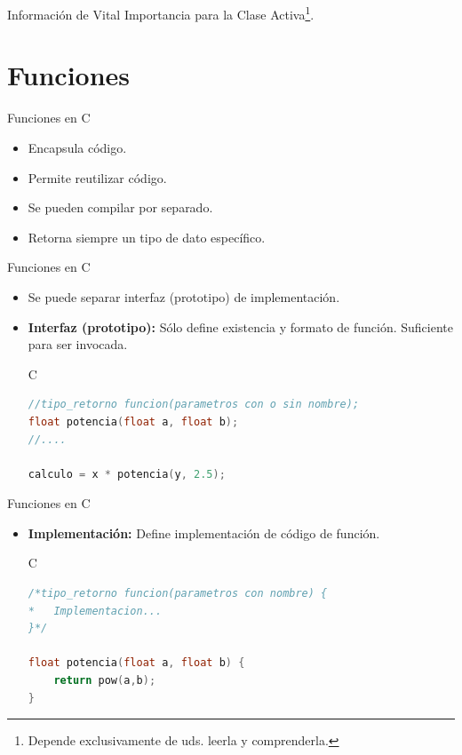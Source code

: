 \documentclass{beamer}
\begin{document}
\begin{frame}
\centering \Huge Información de Vital Importancia para la Clase Activa\footnote{Depende exclusivamente de uds. leerla y comprenderla.}.
\end{frame}
\section{Funciones}
\begin{frame}[fragile]{Funciones en C}
\begin{itemize}
	\item Encapsula código.
	\item Permite reutilizar código.
	\item Se pueden compilar por separado.
	\item Retorna siempre un tipo de dato específico. 
\end{itemize}
\end{frame}

\begin{frame}[fragile]{Funciones en C}
\begin{itemize}
	\item Se puede separar interfaz (prototipo) de implementación.
	\item \textbf{Interfaz (prototipo):} Sólo define existencia y formato de función. Suficiente para ser invocada.
	\begin{exampleblock}{C}
	\begin{lstlisting}[language=C, basicstyle=\tiny]
//tipo_retorno funcion(parametros con o sin nombre);
float potencia(float a, float b);
//....

calculo = x * potencia(y, 2.5);
\end{lstlisting}\end{exampleblock}
\end{itemize}
\end{frame}

\begin{frame}[fragile]{Funciones en C}
\begin{itemize}	
	\item \textbf{Implementación:} Define implementación de código de función.
	\begin{exampleblock}{C}
\begin{lstlisting}[language=C, basicstyle=\tiny]
/*tipo_retorno funcion(parametros con nombre) {
*	Implementacion...
}*/

float potencia(float a, float b) {
	return pow(a,b);
}
\end{lstlisting}\end{exampleblock}
\end{itemize}
\end{frame}
\end{document}
